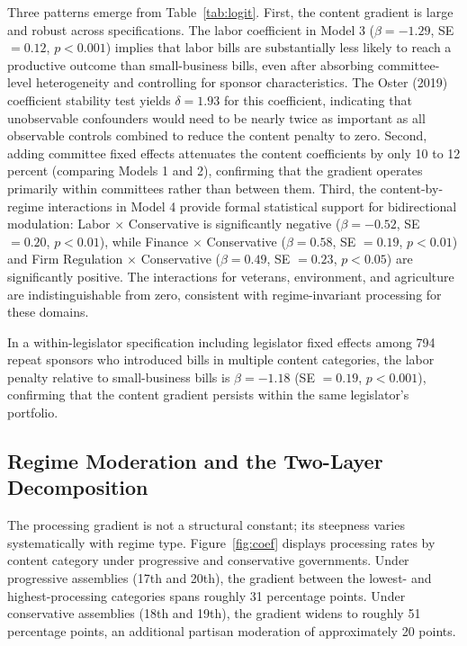 \documentclass[11pt]{article}
\begin{document}
Three patterns emerge from Table~\ref{tab:logit}. First, the content gradient is large and robust across specifications. The labor coefficient in Model 3 ($\beta = -1.29$, SE $= 0.12$, $p < 0.001$) implies that labor bills are substantially less likely to reach a productive outcome than small-business bills, even after absorbing committee-level heterogeneity and controlling for sponsor characteristics. The Oster (2019) coefficient stability test yields $\delta = 1.93$ for this coefficient, indicating that unobservable confounders would need to be nearly twice as important as all observable controls combined to reduce the content penalty to zero. Second, adding committee fixed effects attenuates the content coefficients by only 10 to 12 percent (comparing Models 1 and 2), confirming that the gradient operates primarily within committees rather than between them. Third, the content-by-regime interactions in Model 4 provide formal statistical support for bidirectional modulation: Labor $\times$ Conservative is significantly negative ($\beta = -0.52$, SE $= 0.20$, $p < 0.01$), while Finance $\times$ Conservative ($\beta = 0.58$, SE $= 0.19$, $p < 0.01$) and Firm Regulation $\times$ Conservative ($\beta = 0.49$, SE $= 0.23$, $p < 0.05$) are significantly positive. The interactions for veterans, environment, and agriculture are indistinguishable from zero, consistent with regime-invariant processing for these domains.

In a within-legislator specification including legislator fixed effects among 794 repeat sponsors who introduced bills in multiple content categories, the labor penalty relative to small-business bills is $\beta = -1.18$ (SE $= 0.19$, $p < 0.001$), confirming that the content gradient persists within the same legislator's portfolio.

\subsection{Regime Moderation and the Two-Layer Decomposition}

The processing gradient is not a structural constant; its steepness varies systematically with regime type. Figure~\ref{fig:coef} displays processing rates by content category under progressive and conservative governments. Under progressive assemblies (17th and 20th), the gradient between the lowest- and highest-processing categories spans roughly 31 percentage points. Under conservative assemblies (18th and 19th), the gradient widens to roughly 51 percentage points, an additional partisan moderation of approximately 20 points.
\end{document}

